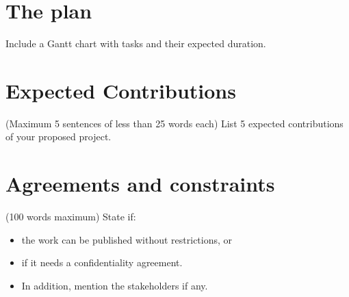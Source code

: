 \documentclass[11pt,a4paper]{article}
\begin{document}
\section{The plan}
Include a Gantt chart with tasks and their expected duration. 

\section{Expected Contributions}
({\color{blue}Maximum 5 sentences of less than 25 words each}) List 5 expected contributions of your proposed project.
 
\section{Agreements and constraints}
({\color{blue}100 words maximum}) State if: 

\begin{itemize}
\item the work can be published without restrictions, or 
\item if it needs a confidentiality agreement.
\item In addition, mention the stakeholders if any.
\end{itemize}




\end{document}
